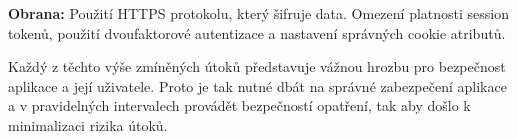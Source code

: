 \textbf{Obrana:} Použití HTTPS protokolu, který šifruje data. Omezení platnosti session tokenů, použití dvoufaktorové autentizace a nastavení správných cookie atributů.
\newline

Každý z těchto výše zmíněných útoků představuje vážnou hrozbu pro bezpečnost aplikace a její uživatele. Proto je tak nutné dbát na správné zabezpečení aplikace a v pravidelných intervalech provádět bezpečností opatření, tak aby došlo k minimalizaci rizika útoků.

\newpage
{}

\endinput
